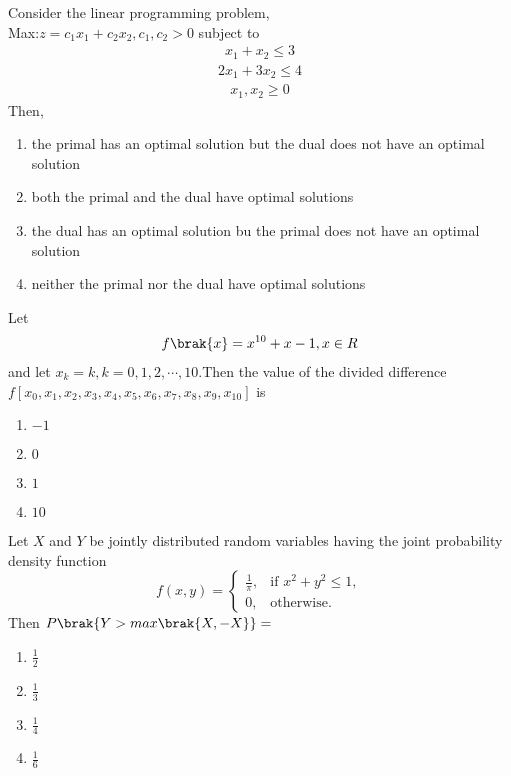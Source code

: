 \item Consider the linear programming problem,\\Max:$z=c_1x_1+c_2x_2,c_1,c_2>0$ subject to
\begin{align*}
    x_1+x_2 \leq 3
\end{align*}
\begin{align*}
    2x_1+3x_2 \leq 4
\end{align*}
\begin{align*}
    x_1,x_2\geq 0
\end{align*}
Then,
\begin{enumerate}
    \item the primal has an optimal solution but the dual does not have an optimal solution
    \item both the primal and the dual have optimal solutions 
    \item the dual has an optimal solution bu the primal does not have an optimal solution
    \item neither the primal nor the dual have optimal solutions
\end{enumerate}    
\item Let 
\begin{align*}
    f\brak{x}=x^{10}+x-1,x \in R
\end{align*}
and let $x_k=k, k=0,1,2,\cdots,10$.Then the value of the divided difference \\$f[x_0,x_1,x_2,x_3,x_4,x_5,x_6,x_7,x_8,x_9,x_{10}]$ is 
\begin{multicols}{2}
\begin{enumerate}
  \item $-1$
    \item $0$
    \item $1$
    \item $10$
\end{enumerate}    
\end{multicols}
\item Let $X$ and $Y$ be jointly distributed random variables having the joint probability density function 
\[
f(x,y) = \begin{cases}
\frac{1}{\pi}, & \text{if } x^2 + y^2 \leq 1, \\
0, & \text{otherwise.}
\end{cases}
\]
Then $P\brak{Y>max\brak{X,-X}}=$
\begin{multicols}{2}
    \begin{enumerate}
    \item $\frac{1}{2}$
    \item $\frac{1}{3}$
    \item $\frac{1}{4}$
    \item $\frac{1}{6}$
\end{enumerate}
\end{multicols}
